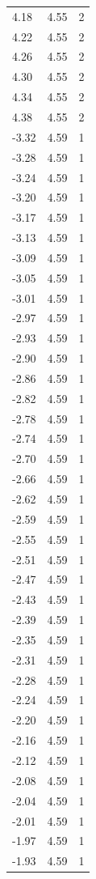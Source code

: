\begin{longtable}{lrr}
  4.18 & 4.55 & 2 \\
  4.22 & 4.55 & 2 \\
  4.26 & 4.55 & 2 \\
  4.30 & 4.55 & 2 \\
  4.34 & 4.55 & 2 \\
  4.38 & 4.55 & 2 \\
  -3.32 & 4.59 & 1 \\
  -3.28 & 4.59 & 1 \\
  -3.24 & 4.59 & 1 \\
  -3.20 & 4.59 & 1 \\
  -3.17 & 4.59 & 1 \\
  -3.13 & 4.59 & 1 \\
  -3.09 & 4.59 & 1 \\
  -3.05 & 4.59 & 1 \\
  -3.01 & 4.59 & 1 \\
  -2.97 & 4.59 & 1 \\
  -2.93 & 4.59 & 1 \\
  -2.90 & 4.59 & 1 \\
  -2.86 & 4.59 & 1 \\
  -2.82 & 4.59 & 1 \\
  -2.78 & 4.59 & 1 \\
  -2.74 & 4.59 & 1 \\
  -2.70 & 4.59 & 1 \\
  -2.66 & 4.59 & 1 \\
  -2.62 & 4.59 & 1 \\
  -2.59 & 4.59 & 1 \\
  -2.55 & 4.59 & 1 \\
  -2.51 & 4.59 & 1 \\
  -2.47 & 4.59 & 1 \\
  -2.43 & 4.59 & 1 \\
  -2.39 & 4.59 & 1 \\
  -2.35 & 4.59 & 1 \\
  -2.31 & 4.59 & 1 \\
  -2.28 & 4.59 & 1 \\
  -2.24 & 4.59 & 1 \\
  -2.20 & 4.59 & 1 \\
  -2.16 & 4.59 & 1 \\
  -2.12 & 4.59 & 1 \\
  -2.08 & 4.59 & 1 \\
  -2.04 & 4.59 & 1 \\
  -2.01 & 4.59 & 1 \\
  -1.97 & 4.59 & 1 \\
  -1.93 & 4.59 & 1 \\

\end{longtable}
